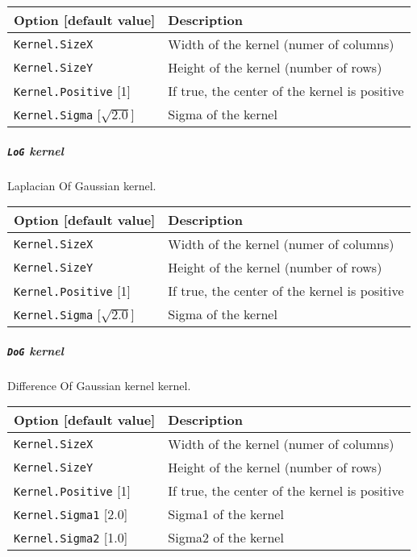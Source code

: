 \documentclass[a4paper,11pt,oneside]{article}
\begin{document}
\begin{center}
 \begin{tabular}{| m{4cm} | m{7cm} | }
 \hline
 Option [default value] & Description\\
 \hline\hline
  \cellcolor{requiredcolor}\lstinline!Kernel.SizeX! & Width of the kernel
  (numer of columns)\\
  \cellcolor{requiredcolor}\lstinline!Kernel.SizeY! & Height of the kernel
  (number of rows)\\
  \lstinline!Kernel.Positive! [1] & If true, the center of the kernel is
  positive\\
  \lstinline!Kernel.Sigma! [$\sqrt{2.0}$] & Sigma of the kernel\\
 \hline
\end{tabular}
\end{center}


\subparagraph{\texorpdfstring{%
\lstinline[basicstyle=\ttfamily\bfseries]!LoG! kernel}{LoG kernel}}
Laplacian Of Gaussian kernel.

\begin{center}
 \begin{tabular}{| m{4cm} | m{7cm} | }
 \hline
 Option [default value] & Description\\
 \hline\hline
  \cellcolor{requiredcolor}\lstinline!Kernel.SizeX! & Width of the kernel
  (numer of columns)\\
  \cellcolor{requiredcolor}\lstinline!Kernel.SizeY! & Height of the kernel
  (number of rows)\\
  \lstinline!Kernel.Positive! [1] & If true, the center of the kernel is
  positive\\
  \lstinline!Kernel.Sigma! [$\sqrt{2.0}$] & Sigma of the kernel\\
 \hline
\end{tabular}
\end{center}

\subparagraph{\texorpdfstring{%
\lstinline[basicstyle=\ttfamily\bfseries]!DoG! kernel}{DoG kernel}}
Difference Of Gaussian kernel kernel.

\begin{center}
 \begin{tabular}{| m{4cm} | m{7cm} | }
 \hline
 Option [default value] & Description\\
 \hline\hline
  \cellcolor{requiredcolor}\lstinline!Kernel.SizeX! & Width of the kernel
  (numer of columns)\\
  \cellcolor{requiredcolor}\lstinline!Kernel.SizeY! & Height of the kernel
   (number of rows)\\
  \lstinline!Kernel.Positive! [1] & If true, the center of the kernel is
  positive\\
  \lstinline!Kernel.Sigma1! [2.0] & Sigma1 of the kernel\\
  \lstinline!Kernel.Sigma2! [1.0] & Sigma2 of the kernel\\
 \hline
\end{tabular}
\end{center}
\end{document}
